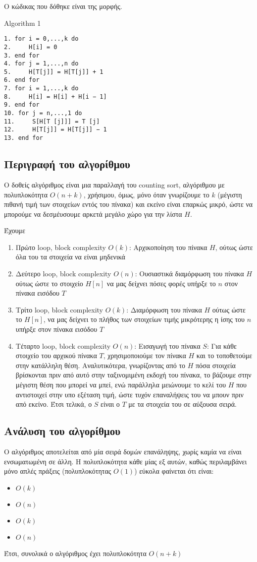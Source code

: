 \documentclass[a4paper,11pt]{article}
\begin{document}
Ο κώδικας που δόθηκε είναι της μορφής. 

Algorithm 1
\begin{verbatim}
1. for i = 0,...,k do
2.     H[i] = 0
3. end for
4. for j = 1,...,n do
5.     H[T[j]] = H[T[j]] + 1
6. end for
7. for i = 1,...,k do
8.     H[i] = H[i] + H[i − 1]
9. end for
10. for j = n,...,1 do
11.     S[H[T [j]]] = T [j]
12.     H[T[j]] = H[T[j]] − 1
13. end for
\end{verbatim}

\subsection{Περιγραφή του αλγορίθμου}
\label{sec:orge9ed7fc}
Ο δοθείς αλγόριθμος είναι μια παραλλαγή του counting sort, αλγόριθμου με
πολυπλοκότητα \(O(n+k)\), χρήσιμου, όμως, μόνο όταν γνωρίζουμε το \(k\) (μέγιστη
πιθανή τιμή των στοιχείων εντός του πίνακα) και εκείνο είναι επαρκώς μικρό, ώστε
να μπορούμε να δεσμέυσουμε αρκετά μεγάλο χώρο για την λίστα \(H\).

Έχουμε
\begin{enumerate}
\item Πρώτο loop, block complexity \(O(k)\):
Αρχικοποίηση του πίνακα \(H\), ούτως ώστε όλα του τα στοιχεία να είναι μηδενικά
\item Δεύτερο loop, block complexity \(O(n)\):
Ουσιαστικά διαμόρφωση του πίνακα \(H\) ούτως ώστε το στοιχείο \(H[n]\) να μας
δείχνει πόσες φορές υπήρξε το \(n\) στον πίνακα εισόδου \(T\)
\item Τρίτο loop, block complexity \(O(k)\):
Διαμόρφωση του πίνακα \(H\) ούτως ώστε το \(H[n]\), να μας δείχνει το πλήθος των
στοιχείων τιμής μικρότερης η ίσης του \(n\) υπήρξε στον πίνακα εισόδου \(T\)
\item Τέταρτο loop, block complexity \(O(n)\): Εισαγωγή του πίνακα \(S\): Για κάθε
στοιχείο του αρχικού πίνακα \(T\), χρησιμοποιούμε τον πίνακα \(H\) και το
τοποθετούμε στην κατάλληλη θέση. Αναλυτικότερα, γνωρίζοντας από το \(H\) πόσα
στοιχεία βρίσκονται πριν από αυτό στην ταξινομιμένη εκδοχή του πίνακα, το
βάζουμε στην μέγιστη θέση που μπορεί να μπεί, ενώ παράλληλα μειώνουμε το κελί
του \(H\) που αντιστοιχεί στην υπο εξέταση τιμή, ώστε τυχόν επαναλήψεις του να
μπουν πριν από εκείνο. Έτσι τελικά, ο \(S\) είναι ο \(T\) με τα στοιχεία του σε
αύξουσα σειρά.
\end{enumerate}

\subsection{Ανάλυση του αλγορίθμου}
\label{sec:orgd9aae76}
Ο αλγόριθμος αποτελείται από μία σειρά δομών επανάληψης, χωρίς καμία να είναι
ενσωματωμένη σε άλλη. Η πολυπλοκότητα κάθε μίας εξ αυτών, καθώς περιλαμβάνει μόνο απλές
πράξεις (πολυπλοκότητας \(O(1)\)) εύκολα φαίνεται ότι είναι:
\begin{itemize}
\item \(O(k)\)
\item \(O(n)\)
\item \(O(k)\)
\item \(O(n)\)
\end{itemize}

Έτσι, συνολικά ο αλγόριθμος έχει πολυπλοκότητα \(O(n+k)\)
\end{document}
